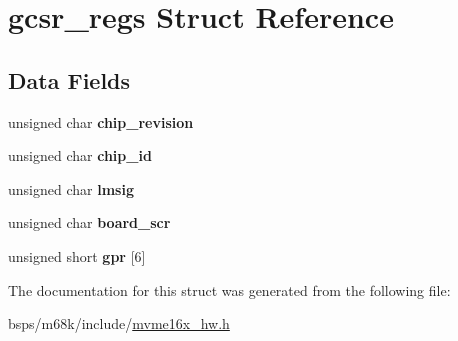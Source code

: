 \hypertarget{structgcsr__regs}{}\section{gcsr\+\_\+regs Struct Reference}
\label{structgcsr__regs}
\subsection*{Data Fields}
\begin{DoxyCompactItemize}
\item 
\mbox{\label{structgcsr__regs_a618d42307926c2e38d07ab062713496e}} 
unsigned char {\bfseries chip\+\_\+revision}
\item 
\mbox{\label{structgcsr__regs_a37caeb5d0e702a068841fe6722aac02e}} 
unsigned char {\bfseries chip\+\_\+id}
\item 
\mbox{\label{structgcsr__regs_a6e9690405fa61a1599be8c4e17c8d183}} 
unsigned char {\bfseries lmsig}
\item 
\mbox{\label{structgcsr__regs_a9fa1c09a93b78a8d93fbe4e96bf8f904}} 
unsigned char {\bfseries board\+\_\+scr}
\item 
\mbox{\label{structgcsr__regs_a359c962a9da89de6e0895f086859ee94}} 
unsigned short {\bfseries gpr} \mbox{[}6\mbox{]}
\end{DoxyCompactItemize}


The documentation for this struct was generated from the following file\+:\begin{DoxyCompactItemize}
\item 
bsps/m68k/include/\mbox{\hyperlink{mvme16x__hw_8h}{mvme16x\+\_\+hw.\+h}}\end{DoxyCompactItemize}

